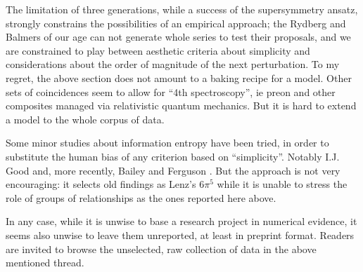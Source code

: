 \documentclass[a4paper,10pt]{article}
\begin{document}
The limitation of three generations, while a success of the supersymmetry ansatz, strongly constrains the possibilities of an empirical approach; the Rydberg and Balmers of our age can not generate whole series to test their proposals, and we are constrained to play between aesthetic criteria about simplicity and considerations about the order of magnitude of the next perturbation. To my regret, the above section does not amount to a baking recipe for a model. Other sets of coincidences seem to allow for ``4th spectroscopy'', ie preon and other composites managed via relativistic quantum mechanics. But it is hard to extend a model to the whole corpus of data. 

Some minor studies about information entropy have been tried, in order to substitute the human bias of any criterion based on  ``simplicity''. Notably I.J. Good and, more recently, Bailey and Ferguson \cite{BaiFer}. But the approach is not very encouraging: it selects old findings as Lenz's $6\pi^5$ \cite{Lenz} while it is unable to stress the role of groups of relationships as the ones reported here above.

In any case, while it is unwise to base a research project in numerical evidence, it seems also unwise to leave them unreported, at least in preprint format. Readers are invited to browse the unselected, raw collection of data in the above mentioned thread.
\end{document}
